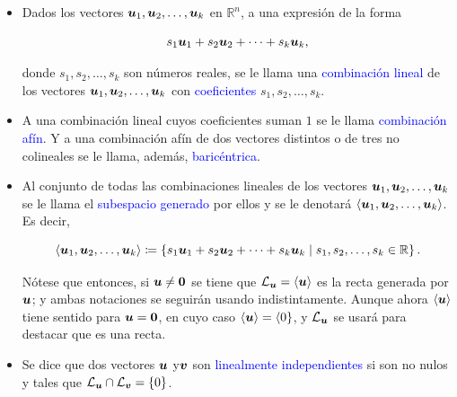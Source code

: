 \documentclass{article}
\theoremstyle{definicion}
\theoremstyle{definition}             %
\theoremstyle{definition}             %
\theoremstyle{definition}
\theoremstyle{definition}
\theoremstyle{observacion}
\theoremstyle{definition}
\theoremstyle{plain}
\theoremstyle{definition}
\theoremstyle{afirmacion}
\theoremstyle{notation}
\theoremstyle{definition}
\begin{document}
    \begin{itemize}[label = \textbullet]
        \item Dados los vectores \(\vb*{u}_{1}, \vb*{u}_{2}, \dots, \vb*{u}_{k}\) en \(\mathbb{R}^{n}\), a una expresión de la forma
        
        \begin{equation*}
            s_{1}\vb*{u}_{1} + s_{2}\vb*{u}_{2} + \dots + s_{k}\vb*{u}_{k},
        \end{equation*}

        donde \(s_{1}, s_{2}, \dots, s_{k}\) son números reales, se le llama una \textcolor{blue}{combinación lineal} de los vectores \(\vb*{u}_{1}, \vb*{u}_{2}, \dots, \vb*{u}_{k}\) con \textcolor{blue}{coeficientes} \(s_{1}, s_{2}, \dots, s_{k}\).

        \item A una combinación lineal cuyos coeficientes suman \(1\) se le llama \textcolor{blue}{combinación afín}. Y a una combinación afín de dos vectores distintos o de tres no colineales se le llama, además, \textcolor{blue}{baricéntrica}.
        
        \item Al conjunto de todas las combinaciones lineales de los vectores \(\vb*{u}_{1}, \vb*{u}_{2}, \dots, \vb*{u}_{k}\) se le llama el \textcolor{blue}{subespacio generado} por ellos y se le denotará \(\left\langle \vb*{u}_{1}, \vb*{u}_{2}, \dots, \vb*{u}_{k}\right\rangle\). Es decir, 
        
        \begin{equation*}
            \left\langle \vb*{u}_{1}, \vb*{u}_{2}, \dots, \vb*{u}_{k}\right\rangle \coloneq \left\lbrace s_{1}\vb*{u}_{1} + s_{2}\vb*{u}_{2} + \dots + s_{k}\vb*{u}_{k} \mid s_{1}, s_{2}, \dots, s_{k} \in \mathbb{R}\right\rbrace.
        \end{equation*}

        Nótese que entonces, si \(\vb*{u} \neq \vb*{0}\) se tiene que \(\mathcal{L}_{\vb*{u}} = \left\langle\vb*{u}\right\rangle\) es la recta generada por \(\vb*{u}\); y ambas notaciones se seguirán usando indistintamente. Aunque ahora \(\left\langle\vb*{u}\right\rangle\) tiene sentido para \(\vb*{u} = \vb*{0}\), en cuyo caso \(\left\langle\vb*{u}\right\rangle = \left\langle 0 \right\rbrace\), y \(\mathcal{L}_{\vb*{u}}\) se usará para destacar que es una recta.

        \item Se dice que dos vectores \(\vb*{u}\) y\(\vb*{v}\) son \textcolor{blue}{linealmente independientes} si son no nulos y tales que \(\mathcal{L}_{\vb*{u}} \cap \mathcal{L}_{\vb*{v}} = \left\lbrace 0\right\rbrace\).
        \end{itemize}
\end{document}
